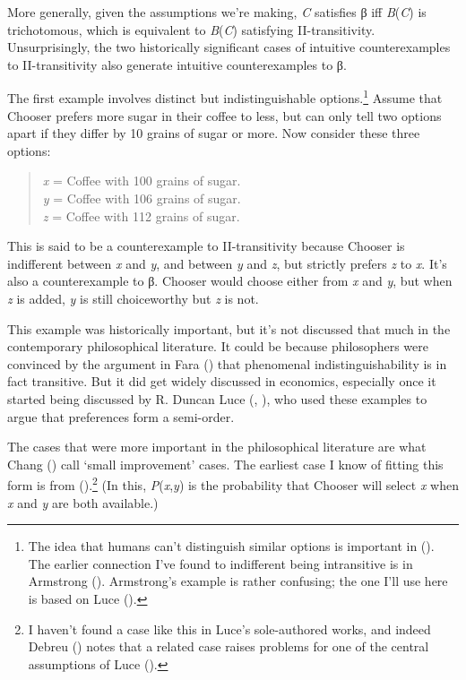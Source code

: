 \documentclass[
  11pt,
  letterpaper,
  DIV=11,
  numbers=noendperiod,
  twoside]{scrartcl}
\begin{document}
More generally, given the assumptions we're making, \emph{C} satisfies β
iff \emph{B}(\emph{C}) is trichotomous, which is equivalent to
\emph{B}(\emph{C}) satisfying II-transitivity. Unsurprisingly, the two
historically significant cases of intuitive counterexamples to
II-transitivity also generate intuitive counterexamples to β.

The first example involves distinct but indistinguishable
options.\footnote{The idea that humans can't distinguish similar options
  is important in ().
  The earlier connection I've found to indifferent being intransitive is
  in Armstrong (). Armstrong's example
  is rather confusing; the one I'll use here is based on Luce
  ().} Assume that Chooser prefers more
sugar in their coffee to less, but can only tell two options apart if
they differ by 10 grains of sugar or more. Now consider these three
options:

\begin{quote}
\emph{x} = Coffee with 100 grains of sugar.\\
\emph{y} = Coffee with 106 grains of sugar.\\
\emph{z} = Coffee with 112 grains of sugar.
\end{quote}

This is said to be a counterexample to II-transitivity because Chooser
is indifferent between \emph{x} and \emph{y}, and between \emph{y} and
\emph{z}, but strictly prefers \emph{z} to \emph{x}. It's also a
counterexample to β. Chooser would choose either from \emph{x} and
\emph{y}, but when \emph{z} is added, \emph{y} is still choiceworthy but
\emph{z} is not.

This example was historically important, but it's not discussed that
much in the contemporary philosophical literature. It could be because
philosophers were convinced by the argument in Fara
() that phenomenal indistinguishability is
in fact transitive. But it did get widely discussed in economics,
especially once it started being discussed by R. Duncan Luce
(, ), who used
these examples to argue that preferences form a semi-order.

The cases that were more important in the philosophical literature are
what Chang () call `small improvement'
cases. The earliest case I know of fitting this form is from
().\footnote{I
  haven't found a case like this in Luce's sole-authored works, and
  indeed Debreu () notes that a related
  case raises problems for one of the central assumptions of Luce
  ().} (In this,
\emph{P}(\emph{x},\emph{y}) is the probability that Chooser will select
\emph{x} when \emph{x} and \emph{y} are both available.)
\end{document}
